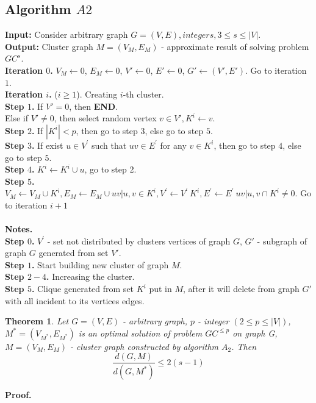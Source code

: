 \documentclass[12pt]{article}
\newtheorem{theorem}{\hspace{1cm}Theorem}
\begin{document}
\subsection*{Algorithm $A2$}
\textbf{Input:} Consider arbitrary graph $ G = (V,E), integer s, 3 \leq s \leq |V|$.
\\ \textbf{Output:} Cluster graph $M = (V_M,E_M)$ - approximate result of solving problem $GC^{s}$.
\\ \textbf{Iteration $0$.} $V_M \leftarrow 0$, $E_M \leftarrow 0$, $V' \leftarrow 0$, $E' \leftarrow 0$, $G' \leftarrow (V',E')$. Go to iteration $1$.
\\ \textbf{Iteration $i$.} ($i \geq 1 $). Creating $i$-th cluster.
\\ \textbf{Step $1$.} If $V'=0$, then \textbf{END}.
\\ Else if $V' \neq 0$, then select random vertex  $v\in V', K^i \leftarrow {v}$.
\\ \textbf{Step $2$.} If $|K^i|<p$, then go to step $3$, else go to step $5$.
\\ \textbf{Step $3$.} If exist $ u \in V^{'}$ such that $uv \in E^{'}$ for any $v \in K^i $, then go to step $4$, else go to step $5$. 
\\ \textbf{Step $4$.} $K^i \leftarrow K^i\cup {u}$, go to step 2.
\\ \textbf{Step $5$.} $V_M \leftarrow V_M \cup K^i, E_M \leftarrow E_M \cup { uv | u,v \in K^i }, V^{'} \leftarrow V^{'} \ K^i, E^{'} \leftarrow E^{'} \ {uv | {u,v} \cap K^i \neq 0}.$ Go to iteration $i+1$
\\
\\ \textbf{Notes.}
\\ \textbf{Step $0$.} $V^{'}$ - set not distributed by clusters vertices of graph $G$, $G'$ - subgraph of graph $G$ generated from set $V'$.
\\ \textbf{Step $1$.} Start building new cluster of graph $M$.
\\ \textbf{Step $2-4$.} Increasing the cluster.
\\ \textbf{Step $5$.} Clique generated from set $K^i$ put in $M$, after it will delete from graph $G'$ with all incident to its vertices edges.


\begin{theorem}
	Let $G=(V,E)$ - arbitrary graph, $p$ - integer $(2 \leq p \leq |V|)$, $M^* = (V_{M^*},E_{M^*})$ is an optimal solution of problem $GC^{\leq p}$ on graph G, $M = (V_M,E_M)$ - cluster graph constructed by algorithm $A_2$. Then
	$$
	\dfrac{d(G,M)}{d(G,M^*)} \leq 2 (s - 1)
	$$
\end{theorem}
\textbf{Proof.}
\end{document}
